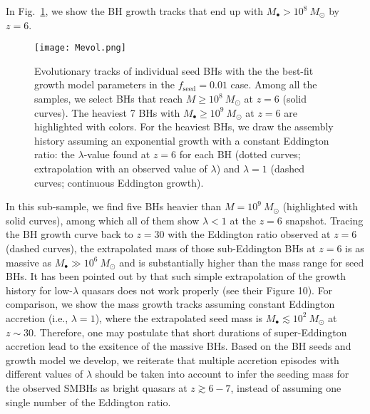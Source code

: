 \documentclass[twocolumn, twocolappendix]{aastex63}
\newcommand{\Msun}{M_\odot}
\newcommand{\Mbh}{M_\bullet}
\newcommand{\fseed}{f_\mathrm{seed}}
\begin{document}
\begin{CJK*}{UTF8}{gbsn}
In Fig.~\ref{fig:Mevol}, we show the BH growth tracks that end up with $M_\bullet>10^8~\Msun$ by $z=6$.
%
\begin{figure}
\centering
\texttt{[image: Mevol.png]}
\caption{
Evolutionary tracks of individual seed BHs with the the best-fit growth model parameters in the $\fseed=0.01$ case.
Among all the samples, we select BHs that reach $M\geq 10^8~\Msun$ at $z=6$ (solid curves). 
The heaviest 7 BHs with $M_\bullet \geq 10^9~\Msun$ at $z=6$ are highlighted with colors. 
For the heaviest BHs, we draw the assembly history assuming an exponential growth with a constant Eddington ratio: 
the $\lambda$-value found at $z=6$ for each BH (dotted curves; extrapolation with an observed value of $\lambda$) and 
$\lambda =1$ (dashed curves; continuous Eddington growth).
}
\label{fig:Mevol}
\end{figure}
%
%
In this sub-sample, we find five BHs heavier than $M=10^9~\Msun$ (highlighted with solid curves),
among which all of them show $\lambda<1$ at the  $z=6$ snapshot.
Tracing the BH growth curve back to $z=30$ with the Eddington ratio observed at $z=6$ (dashed curves),
the extrapolated mass of those sub-Eddington BHs at $z=6$ is as massive as $\Mbh \gg 10^6~\Msun$ and is 
substantially higher than the mass range for seed BHs.
%
It has been pointed out by \cite{2019ApJ...880...77O} that such simple extrapolation of the growth history for low-$\lambda$ quasars 
does not work properly (see their Figure 10).
For comparison, we show the mass growth tracks assuming constant Eddington accretion (i.e., $\lambda=1$),
where the extrapolated seed mass is $\Mbh \lesssim 10^2~\Msun$ at $z\sim 30$.
Therefore, one may postulate that short durations of super-Eddington accretion lead to the exsitence of the massive BHs.
Based on the BH seeds and growth model we develop,
we reiterate that multiple accretion episodes with different values of $\lambda$ should be taken into account 
to infer the seeding mass for the observed SMBHs as bright quasars at $z\gtrsim 6-7$,
instead of assuming one single number of the Eddington ratio.



\end{CJK*}
\end{document}
